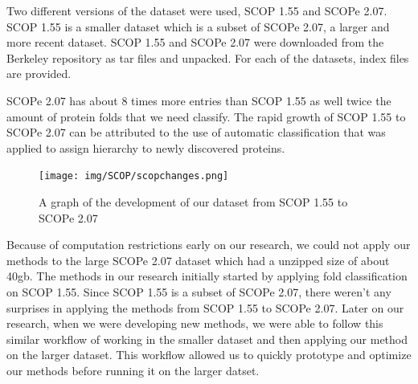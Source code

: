 \documentclass[12pt, a4paper, twocolumn, fullpage]{article}
\theoremstyle{plain}
\theoremstyle{definition}
\theoremstyle{remark}
\begin{document}
Two different versions of the dataset were used, SCOP 1.55 and SCOPe 2.07. SCOP 1.55 is a smaller dataset which is a subset of SCOPe 2.07, a larger and more recent dataset. SCOP 1.55  and SCOPe 2.07 were downloaded from the Berkeley repository as tar files and unpacked. For each of the datasets, index files are provided.

SCOPe 2.07 has about 8 times more entries than SCOP 1.55 as well twice the amount of protein folds that we need classify. The rapid growth of SCOP 1.55 to SCOPe 2.07 can be attributed to the use of automatic classification that was applied to assign hierarchy to newly discovered proteins. 

\begin{figure}
	\centering
    \texttt{[image: img/SCOP/scopchanges.png]}
    \caption{A graph of the development of our dataset from SCOP 1.55 to SCOPe 2.07}
    \label{SCOPchanges}
\end{figure}

Because of computation restrictions early on our research, we could not apply our methods to the large SCOPe 2.07 dataset which had a unzipped size of about 40gb. The methods in our research initially started by applying fold classification on SCOP 1.55. Since SCOP 1.55 is a subset of SCOPe 2.07, there weren't any surprises in applying the methods from SCOP 1.55 to SCOPe 2.07. Later on our research, when we were developing new methods, we were able to follow this similar workflow of working in the smaller dataset and then applying our method on the larger dataset. This workflow allowed us to quickly prototype and optimize our methods before running it on the larger datset.
\end{document}
